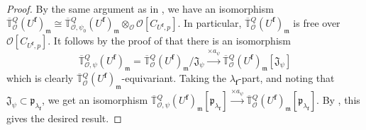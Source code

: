 \documentclass[a4paper, notitlepage, 10pt]{amsart}
\theoremstyle{plain} %
\theoremstyle{definition} %
\theoremstyle{remark} %
\numberwithin{equation}{section}
\begin{document}
\begin{proof}
    By the same argument as in \cite[Lemma 4.16]{Man21}, we have an isomorphism $\overline{\mathbb{T}}{}^{Q}_{\mathcal{O}}(U^{\mathbf{f}})_{\mathfrak{m}}\cong \overline{\mathbb{T}}{}^{Q}_{\mathcal{O},\psi_0}(U^{\mathbf{f}})_{\mathfrak{m}}\otimes_{\mathcal{O}} \mathcal{O}[C_{U^{\mathbf{f}},p}]$. In particular, $\overline{\mathbb{T}}{}^{Q}_{\mathcal{O}}(U^{\mathbf{f}})_{\mathfrak{m}}$ is free over $\mathcal{O}[C_{U^{\mathbf{f}},p}]$.
    It follows by the proof of \cite[Lemma 4.11]{Man21} that there is an isomorphism 
     $$ \overline{\mathbb{T}}{}^{Q}_{\mathcal{O},\psi}(U^{\mathbf{f}})_{\mathfrak{m}}= \overline{\mathbb{T}}{}^{Q}_{\mathcal{O}}(U^{\mathbf{f}})_{\mathfrak{m}}/\mathfrak{J}_\psi \xrightarrow{\times a_\psi} \overline{\mathbb{T}}{}^{Q}_{\mathcal{O}}(U^{\mathbf{f}})_{\mathfrak{m}}[\mathfrak{J}_\psi]  $$
     which is clearly $\overline{\mathbb{T}}{}^{Q}_{\mathcal{O}}(U^{\mathbf{f}})_{\mathfrak{m}}$-equivariant. Taking the $\lambda_{\mathbf{f}}$-part, and noting that $\mathfrak{J}_{\psi}\subset \mathfrak{p}_{\lambda_{\mathbf{f}}}$, we get an isomorphism $\overline{\mathbb{T}}{}^{Q}_{\mathcal{O},\psi}(U^{\mathbf{f}})_{\mathfrak{m}}[\mathfrak{p}_{\lambda_{\mathbf{f}}}]\xrightarrow{\times a_{\psi}}\overline{\mathbb{T}}{}^{Q}_{\mathcal{O}}(U^{\mathbf{f}})_{\mathfrak{m}}[\mathfrak{p}_{\lambda_{\mathbf{f}}}]$. By , this gives the desired result.
\end{proof}
\end{document}
